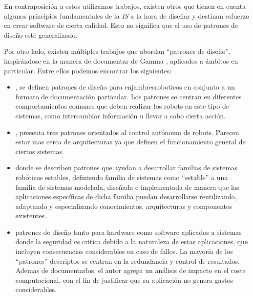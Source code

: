 En contraposición a estos utilizamos trabajos, existen otros \cite{good-desing-agrobot,good-desing-street} que tienen en cuenta algunos principios fundamentales de la \textit{IS} a la hora de diseñar y destinan esfuerzo en crear software de cierta calidad. Esto no significa que el uso de patrones de diseño esté generalizado.

Por otro lado, existen múltiples trabajos que abordan ``patrones de diseño'',  inspirándose en la manera de documentar de Gamma \cite{Gamma:1995:DPE:186897}, aplicados a ámbitos en particular. Entre ellos podemos encontrar los siguientes:

\begin{itemize}
\item \cite{enjambre}, se definen patrones de diseño para \gls{enjambresroboticos} en conjunto a un formato de documentación particular. Los patrones se centran en diferentes comportamientos comunes que deben realizar los robots en este tipo de sistemas, como intercambiar información u llevar a cabo cierta acción.

\item \cite{patterns_2013}, presenta tres patrones orientados al control autónomo de robots. Parecen estar mas cerca de arquitecturas ya que definen el funcionamiento general de ciertos sistemas.

\item \cite{stable} donde se describen patrones que ayudan a desarrollar familias de sistemas robóticos estables, definiendo familia de sistemas como ``estable'' a una familia de sistemas modelada, diseñada e implementada de manera que las aplicaciones específicas de dicha familia puedan desarrollarse reutilizando, adaptando y especializando conocimientos, arquitecturas y componentes existentes.

\item \cite{critical} patrones de diseño tanto para hardware como software aplicados a sistemas donde la seguridad es critica debido a la naturaleza de estas aplicaciones, que incluyen consecuencias considerables en caso de fallos. La mayoría de los ``patrones'' descriptos se centran en la redundancia y control de resultados. Ademas de documentarlos, el autor agrega un análisis de impacto en el coste computacional, con el fin de justificar que su aplicación no genera gastos considerables.

\end{itemize}

